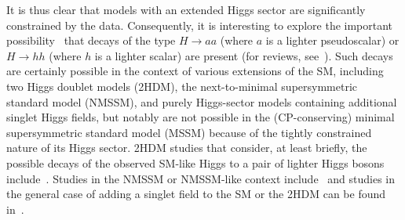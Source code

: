 It is thus clear that models with an extended Higgs sector are significantly constrained by the data.  Consequently, it is interesting to explore the important possibility~\cite{Dermisek:2005ar,Dermisek:2006wr} that decays of the type $H$$\rightarrow$$aa$ (where $a$ is a lighter pseudoscalar) or $H$$\rightarrow$$hh$ (where $h$ is a lighter scalar) are present (for reviews, see~\cite{Chang:2008cw,Curtin:2013fra}). Such decays are certainly possible in the context of various extensions of the SM, including two Higgs doublet models (2HDM), the next-to-minimal supersymmetric standard model (NMSSM), and purely Higgs-sector models containing additional singlet Higgs fields, but notably are not possible in the (CP-conserving) minimal supersymmetric standard model (MSSM) because of the tightly constrained nature of its Higgs sector. 2HDM studies that consider, at least briefly, the possible decays of the observed SM-like Higgs to a pair of lighter Higgs bosons include~\cite{Curtin:2013fra,Celis:2013rcs,Grinstein:2013npa,Coleppa:2013dya,Chen:2013rba,Craig:2013hca,Wang:2013sha,Baglio:2014nea}. Studies in the NMSSM or NMSSM-like context include~\cite{Curtin:2013fra,King:2012tr,Cao:2013gba,Christensen:2013dra,Cerdeno:2013cz} and studies in the general case of adding a singlet field to the SM or the 2HDM can be found in~\cite{Curtin:2013fra,Chalons:2012qe,Ahriche:2013vqa}.

